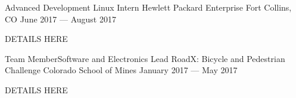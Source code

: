 

\begin{cventries}

  \cventry
    {Advanced Development Linux Intern} %
    {Hewlett Packard Enterprise} %
    {Fort Collins, CO} %
    {June 2017 --- August 2017} %
    {
      \begin{cvitems} %
        \item {DETAILS HERE}
      \end{cvitems}
    }



  \cventry
    {Team Member{\enskip\cdotp\enskip}Software and Electronics Lead} %
    {RoadX\@: Bicycle and Pedestrian Challenge} %
    {Colorado School of Mines} %
    {January 2017 --- May 2017} %
    {
      \begin{cvitems} %
        \item {DETAILS HERE}
      \end{cvitems}
    }


\end{cventries}
